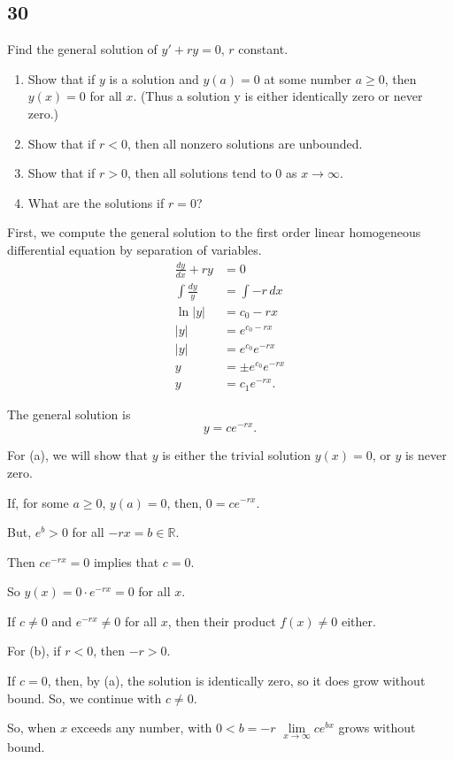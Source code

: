 \documentclass[../hw11]{subfiles}
\begin{document}
\subsection*{30}
Find the general solution of $y'+ry=0$, $r$ constant. 

\begin{enumerate}[label= (\alph*)]
    \item Show that if $y$ is a solution and $y(a)=0$ at some number $a\geq0$, then $y(x)=0$ for all $x$. (Thus a solution y is either identically zero or never zero.)
    \item Show that if $r<0$, then all nonzero solutions are unbounded.
    \item Show that if $r>0$, then all solutions tend to $0$ as $x\to\infty$.
    \item What are the solutions if $r=0$?
\end{enumerate}

First, we compute the general solution to the first order linear homogeneous differential equation by separation of variables.
\begin{align*}
    \frac{dy}{dx}+ry&=0\\
    \int \frac{dy}{y} &= \int -r\,dx \\
    \ln{|y|}&=c_0-rx\\
    |y|&=e^{c_0-rx} \\
    |y|&=e^{c_0}e^{-rx} \\
    y&=\pm e^{c_0}e^{-rx} \\
    y&=c_1 e^{-rx}.
\end{align*}

The general solution is \[y=ce^{-rx}.\]

For (a), we will show that $y$ is either the trivial solution $y(x)=0$, or $y$ is never zero.

If, for some $a\geq0$, $y(a)=0$, then, $0=ce^{-rx}$.

But, $e^b>0$ for all $-rx = b \in \mathbb{R}$.

Then $ce^{-rx}=0$ implies that $c=0$.

So $y(x)=0\cdot e^{-rx}=0$ for all $x$.

If $c\neq 0$ and $e^{-rx}\neq0$ for all $x$, then their product $f(x)\neq0$ either.

For (b), if $r<0$, then $-r>0$.

If $c=0$, then, by (a), the solution is identically zero, so it does grow without bound. So, we continue with $c\neq0$.

So, when $x$ exceeds any number, with $0<b=-r$ $\lim\limits_{x\to\infty} ce^{bx}$ grows without bound.
\end{document}

